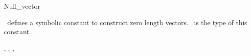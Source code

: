 \begin{ccRefClass}{Null_vector}

\ccDefinition
\cgal\ defines a symbolic constant
 to construct zero length vectors.
\ccRefName\ is the type of this constant.

\ccSeeAlso
{}, , , 

\end{ccRefClass}
